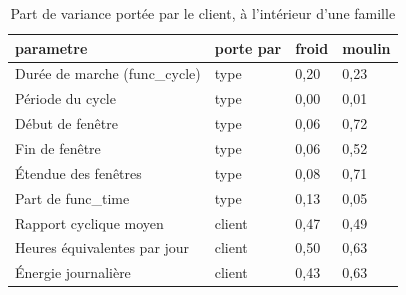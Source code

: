 \begin{table}[htbp]
\caption{Part de variance portée par le client, à l'intérieur d'une famille}
\label{tab:transfert_variance}
\begin{tabular}{llll}
\toprule
parametre & porte par & froid & moulin \\
\midrule
Durée de marche (func\_cycle) & type & 0,20 & 0,23 \\
Période du cycle & type & 0,00 & 0,01 \\
Début de fenêtre & type & 0,06 & 0,72 \\
Fin de fenêtre & type & 0,06 & 0,52 \\
Étendue des fenêtres & type & 0,08 & 0,71 \\
Part de func\_time & type & 0,13 & 0,05 \\
Rapport cyclique moyen & client & 0,47 & 0,49 \\
Heures équivalentes par jour & client & 0,50 & 0,63 \\
Énergie journalière & client & 0,43 & 0,63 \\
\bottomrule
\end{tabular}
\end{table}
